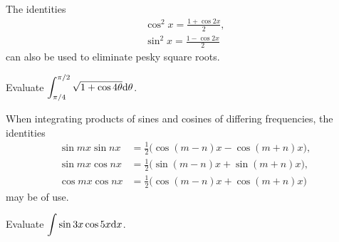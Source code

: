 \newpage

\begin{remark}
The identities 
\begin{align*}
\cos^2 x = \frac{1+\cos 2x}{2},\\
\sin^2 x = \frac{1-\cos 2x}{2}
\end{align*}
can also be used to eliminate pesky square roots.
\end{remark}

\begin{example}
Evaluate $\displaystyle\int_{\pi/4}^{\pi/2}\sqrt{1+\cos 4\theta}\mathrm{d}\theta$.
\end{example}

\newpage

\begin{remark}
When integrating products of sines and cosines of differing frequencies, the identities
\begin{align*}
\sin mx\sin nx &= \frac{1}{2}\big(\cos(m-n)x - \cos(m+n)x\big),\\
\sin mx\cos nx &= \frac{1}{2}\big(\sin(m-n)x + \sin(m+n)x\big),\\
\cos mx\cos nx &= \frac{1}{2}\big(\cos(m-n)x + \cos(m+n)x\big)
\end{align*}
may be of use.
\end{remark}

\begin{example}
Evaluate $\displaystyle\int \sin 3x\cos 5x\mathrm{d} x$.
\end{example}
